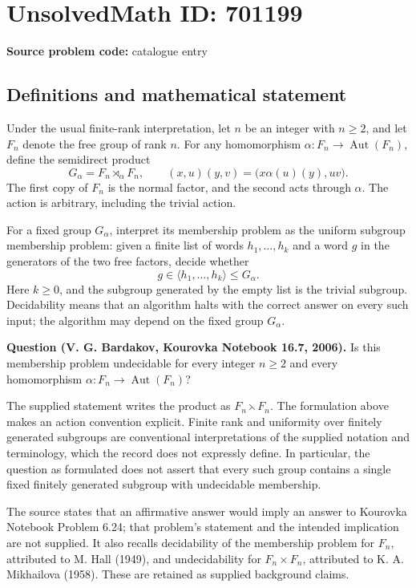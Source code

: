 \documentclass[11pt]{article}
\begin{document}
\section*{UnsolvedMath ID: 701199}
\textbf{Source problem code:} catalogue entry
\subsection{Definitions and mathematical statement}
Under the usual finite-rank interpretation, let \(n\) be an integer with \(n\geq 2\), and let \(F_n\) denote the free group of rank \(n\). For any homomorphism \(\alpha:F_n\to\operatorname{Aut}(F_n)\), define the semidirect product
\[
G_\alpha=F_n\rtimes_\alpha F_n,
\qquad
(x,u)(y,v)=\bigl(x\alpha(u)(y),uv\bigr).
\]
The first copy of \(F_n\) is the normal factor, and the second acts through \(\alpha\). The action is arbitrary, including the trivial action.

For a fixed group \(G_\alpha\), interpret its membership problem as the uniform subgroup membership problem: given a finite list of words \(h_1,\ldots,h_k\) and a word \(g\) in the generators of the two free factors, decide whether
\[
g\in\langle h_1,\ldots,h_k\rangle\leq G_\alpha.
\]
Here \(k\geq 0\), and the subgroup generated by the empty list is the trivial subgroup. Decidability means that an algorithm halts with the correct answer on every such input; the algorithm may depend on the fixed group \(G_\alpha\).

\textbf{Question (V. G. Bardakov, Kourovka Notebook 16.7, 2006).} Is this membership problem undecidable for every integer \(n\geq 2\) and every homomorphism \(\alpha:F_n\to\operatorname{Aut}(F_n)\)?

The supplied statement writes the product as \(F_n\leftthreetimes F_n\). The formulation above makes an action convention explicit. Finite rank and uniformity over finitely generated subgroups are conventional interpretations of the supplied notation and terminology, which the record does not expressly define. In particular, the question as formulated does not assert that every such group contains a single fixed finitely generated subgroup with undecidable membership.

The source states that an affirmative answer would imply an answer to Kourovka Notebook Problem 6.24; that problem's statement and the intended implication are not supplied. It also recalls decidability of the membership problem for \(F_n\), attributed to M. Hall (1949), and undecidability for \(F_n\times F_n\), attributed to K. A. Mikhailova (1958). These are retained as supplied background claims.
\end{document}
